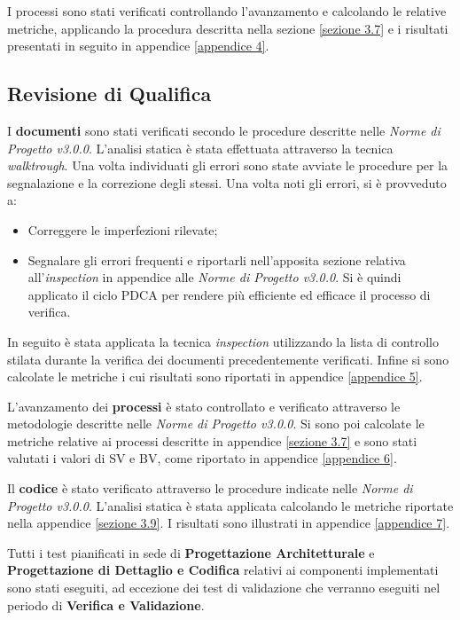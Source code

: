 \noindent I processi sono stati verificati controllando l'avanzamento e calcolando le relative metriche, applicando la procedura descritta nella sezione \ref{sezione 3.7} e i risultati presentati in seguito in appendice \ref{appendice 4}.

\subsection{Revisione di Qualifica}

I \textbf{documenti} sono stati verificati secondo le procedure descritte nelle \textit{Norme di Progetto v3.0.0}. L'analisi statica è stata effettuata attraverso la tecnica \textit{walktrough}. Una volta individuati gli errori sono state avviate le procedure per la segnalazione e la correzione degli stessi. Una volta noti gli errori, si è provveduto a:
\begin{itemize}
	\item Correggere le imperfezioni rilevate;
	\item Segnalare gli errori frequenti e riportarli nell'apposita sezione relativa all'\textit{inspection} in appendice alle \textit{Norme di Progetto v3.0.0}. Si è quindi applicato il ciclo PDCA per rendere più efficiente ed efficace il processo di verifica.
\end{itemize}

\noindent In seguito è stata applicata la tecnica \textit{inspection} utilizzando la lista di controllo stilata durante la verifica dei documenti precedentemente verificati. Infine si sono calcolate le metriche i cui risultati sono riportati in appendice \ref{appendice 5}.

\noindent L'avanzamento dei \textbf{processi} è stato controllato e verificato attraverso le metodologie descritte nelle \textit{Norme di Progetto v3.0.0}. Si sono poi calcolate le metriche relative ai processi descritte in appendice \ref{sezione 3.7} e sono stati valutati i valori di SV e BV, come riportato in appendice \ref{appendice 6}.

\noindent Il \textbf{codice} è stato verificato attraverso le procedure indicate nelle \textit{Norme di Progetto v3.0.0}. L'analisi statica è stata applicata calcolando le metriche riportate nella appendice \ref{sezione 3.9}. I risultati sono illustrati in appendice \ref{appendice 7}.

\noindent Tutti i test pianificati in sede di \textbf{Progettazione Architetturale} e \textbf{Progettazione di Dettaglio e Codifica} relativi ai componenti implementati sono stati eseguiti, ad eccezione dei test di validazione che verranno eseguiti nel periodo di \textbf{Verifica e Validazione}.